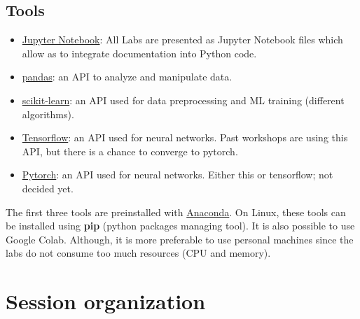 \documentclass[11pt, a4paper]{article}
\begin{document}
\subsection{Tools}

\begin{itemize}
	\item \href{https://jupyter.org}{Jupyter Notebook}: All Labs are presented as Jupyter Notebook files which allow as to integrate documentation into Python code.
	\item \href{https://pandas.pydata.org/}{pandas}: an API to analyze and manipulate data.
	\item \href{https://scikit-learn.org/}{scikit-learn}: an API used for data preprocessing and ML training (different algorithms).
	\item \href{https://www.tensorflow.org/}{Tensorflow}: an API used for neural networks. Past workshops are using this API, but there is a chance to converge to pytorch.
	\item \href{https://pytorch.org/}{Pytorch}: an API used for neural networks. Either this or tensorflow; not decided yet.
\end{itemize}

The first three tools are preinstalled with \href{https://www.anaconda.com/products/individual#Downloads}{Anaconda}.
On Linux, these tools can be installed using \textbf{pip} (python packages managing tool).
It is also possible to use Google Colab. 
Although, it is more preferable to use personal machines since the labs do not consume too much resources (CPU and memory).

\section{Session organization}
\end{document}
